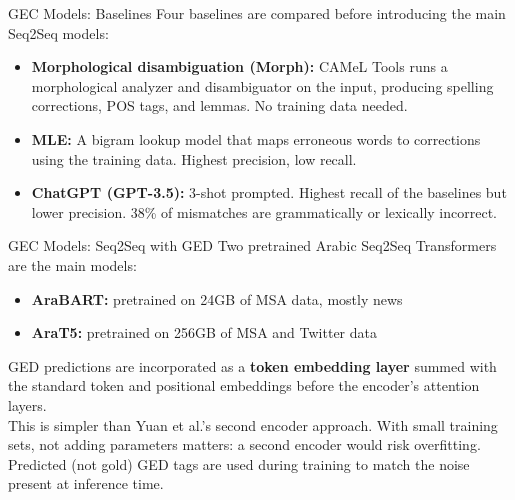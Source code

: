 \documentclass[aspectratio=169]{beamer}
\begin{document}

\begin{frame}{GEC Models: Baselines}
  Four baselines are compared before introducing the main Seq2Seq models:

  \begin{itemize}
    \item \textbf{Morphological disambiguation (Morph):} CAMeL Tools
      runs a morphological analyzer and disambiguator on the input,
      producing spelling corrections, POS tags, and lemmas.
      No training data needed.
    \item \textbf{MLE:} A bigram lookup model that maps erroneous words
      to corrections using the training data. Highest precision, low recall.
    \item \textbf{ChatGPT (GPT-3.5):} 3-shot prompted. Highest recall of
      the baselines but lower precision. 38\% of mismatches are
      grammatically or lexically incorrect.
  \end{itemize}
\end{frame}

\begin{frame}{GEC Models: Seq2Seq with GED}
  Two pretrained Arabic Seq2Seq Transformers are the main models:

  \begin{itemize}
    \item \textbf{AraBART:} pretrained on 24GB of MSA data, mostly news
    \item \textbf{AraT5:} pretrained on 256GB of MSA and Twitter data
  \end{itemize}

  \vspace{1em}
  GED predictions are incorporated as a \textbf{token embedding layer}
  summed with the standard token and positional embeddings before the
  encoder's attention layers.\\[1em]

  This is simpler than Yuan et al.'s second encoder approach.
  With small training sets, not adding parameters matters:
  a second encoder would risk overfitting.\\[1em]

  Predicted (not gold) GED tags are used during training
  to match the noise present at inference time.
\end{frame}

\end{document}
